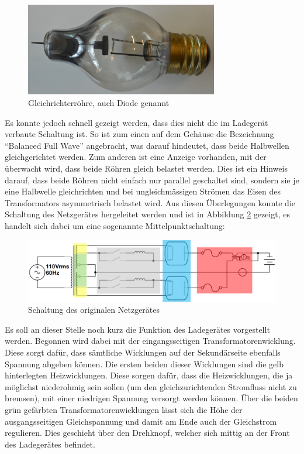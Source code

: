 \begin{figure}[h]
	\centering
		\includegraphics[width=0.75\textwidth]{images/Roehre_Diode.jpg}
	\caption{Gleichrichterröhre, auch Diode genannt}
	\label{fig:Roehre_Diode}
\end{figure}

Es konnte jedoch schnell gezeigt werden, dass dies nicht die im Ladegerät verbaute Schaltung ist. So ist zum einen auf dem Gehäuse die Bezeichnung "`Balanced Full Wave"' angebracht, was darauf hindeutet, dass beide Halbwellen gleichgerichtet werden. Zum anderen ist eine Anzeige vorhanden, mit der überwacht wird, dass beide Röhren gleich belastet werden. Dies ist ein Hinweis darauf, dass beide Röhren nicht einfach nur parallel geschaltet sind, sondern sie je eine Halbwelle gleichrichten und bei ungleichmässigen Strömen das Eisen des Transformators asymmetrisch belastet wird. Aus diesen Überlegungen konnte die Schaltung des Netzgerätes hergeleitet werden und ist in Abbildung \ref{fig:Schema_Ladegeraet_Alt} gezeigt, es handelt sich dabei um eine sogenannte Mittelpunktschaltung:

\begin{figure}[h]
	\centering
		\includegraphics[width=1.00\textwidth]{images/Ladegeraet_Alt_2.PNG}
	\caption{Schaltung des originalen Netzgerätes}
	\label{fig:Schema_Ladegeraet_Alt}
\end{figure}

Es soll an dieser Stelle noch kurz die Funktion des Ladegerätes vorgestellt werden. Begonnen wird dabei mit der eingangsseitigen Transformatorenwicklung. Diese sorgt dafür, dass sämtliche Wicklungen auf der Sekundärseite ebenfalls Spannung abgeben können. Die ersten beiden dieser Wicklungen sind die gelb hinterlegten Heizwicklungen. Diese sorgen dafür, dass die Heizwicklungen, die ja möglichst niederohmig sein sollen (um den gleichzurichtenden Stromfluss nicht zu bremsen), mit einer niedrigen Spannung versorgt werden können. Über die beiden grün gefärbten Transformatorenwicklungen lässt sich die Höhe der ausgangsseitigen Gleichspannung und damit am Ende auch der Gleichstrom regulieren. Dies geschieht über den Drehknopf, welcher sich mittig an der Front des Ladegerätes befindet.

